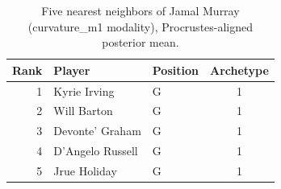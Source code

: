 \begin{table}[htbp]
  \centering\small
  \begin{tabular}{rllc}
    \toprule
    Rank & Player & Position & Archetype \\
    \midrule
    1 & Kyrie Irving & G & 1 \\
    2 & Will Barton & G & 1 \\
    3 & Devonte' Graham & G & 1 \\
    4 & D'Angelo Russell & G & 1 \\
    5 & Jrue Holiday & G & 1 \\
    \bottomrule
  \end{tabular}
  \caption{Five nearest neighbors of Jamal Murray (curvature_m1 modality), Procrustes-aligned posterior mean.}
  \label{tab:Jamal_Murray_neighbors_curvature_m1}
\end{table}

